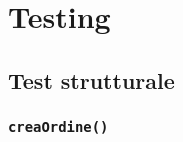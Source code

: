\chapter{Testing}

\section{Test strutturale}

\subsection{\texttt{creaOrdine()}}
\inputminted[breaklines,tabsize=4,obeytabs]{java}{chapters/testing_white_box/creaOrdine.java}

